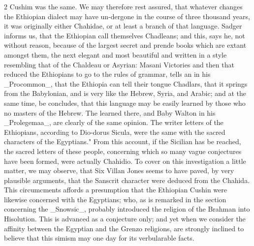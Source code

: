 \documentclass[10pt]{article}
\begin{document}
\begin{multicols}{2}\raggedcolumns
Cushim was the same. We may therefore rest assured, that whatever changes the Ethiopian dialect may have un-dergone in the course of three thousand years, it was originally either Chahidae, or at least a branch of that language. Sadger informs us, that the Ethiopian call themselves Chadleans; and this, says he, not without reason, because of the largest secret and prende books which are extant amongst them, the next elegant and most beautiful and written in a style resembling that of the Chaldeau or Asyrian: Masani Victories and then that reduced the Ethiopians to go to the rules of grammar, tells an in his \_Procommon\_, that the Ethiopia can tell their tongue Chadlars, that it springs from the Babylonian, and is very like the Hebrew, Syria, and Arabic; and at the same time, be concludes, that this language may be easily learned by those who no masters of the Hebrew. The learned there, and Baby Walton in his \_Prolegemaa\_, are clearly of the same opinion. The writer letters of the Ethiopians, according to Dio-dorus Sicula, were the same with the sacred characters of the Egyptians." From this account, if the Sicilian has be reached, the sacred letters of these people, concerning which so many vague conjectures have been formed, were actually Chahidio. To cover on this investigation a little matter, we may observe, that Six Villan Jones seems to have paved, by very plausible arguments, that the Sanscrit character were deduced from the Chahida. This circumcments affords a presumption that the Ethiopian Cushin were likewise concerned with the Egyptians; who, as is remarked in the section concerning the \_Snowsic\_, probably introduced the religion of the Brahman into Hisolution. This is advanced as a conjecture only; and yet when we consider the affinity between the Egyptian and the Grenzo religions, are strongly inclined to believe that this simism may one day for its verbularable facts.


\end{multicols}
\end{document}
